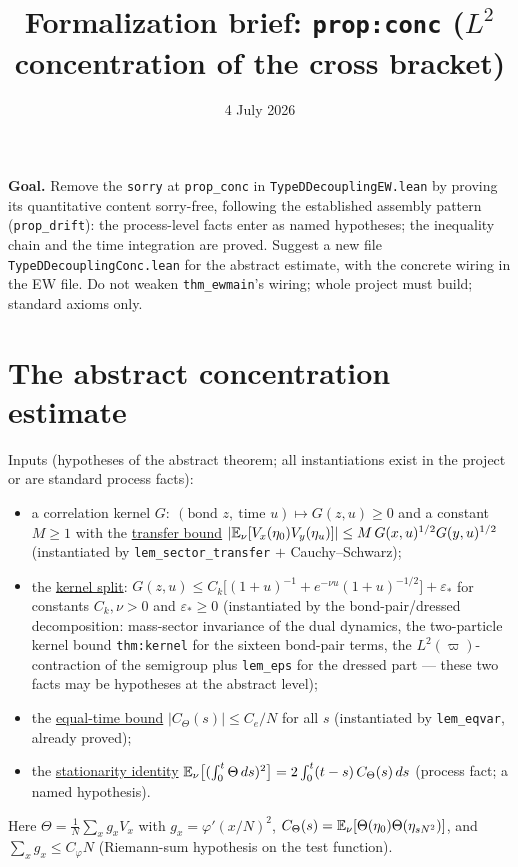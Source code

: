 \documentclass[11pt]{article}
\title{Formalization brief: \texttt{prop:conc} ($L^2$ concentration of the cross bracket)}
\date{4 July 2026}
\theoremstyle{plain}
\theoremstyle{remark}
\newcommand{\eps}{\varepsilon}\newcommand{\vp}{\varpi}
\begin{document}
\maketitle

\noindent\textbf{Goal.} Remove the \texttt{sorry} at \texttt{prop\_conc} in
\texttt{TypeDDecouplingEW.lean} by proving its quantitative content sorry-free,
following the established assembly pattern (\texttt{prop\_drift}): the process-level
facts enter as named hypotheses; the inequality chain and the time integration are
proved. Suggest a new file \texttt{TypeDDecouplingConc.lean} for the abstract
estimate, with the concrete wiring in the EW file. Do not weaken
\texttt{thm\_ewmain}'s wiring; whole project must build; standard axioms only.

\section*{The abstract concentration estimate}

Inputs (hypotheses of the abstract theorem; all instantiations exist in the
project or are standard process facts):
\begin{itemize}
\item a correlation kernel $G:\ (\text{bond }z,\ \text{time }u)\mapsto G(z,u)\ge0$
  and a constant $M\ge1$ with the \underline{transfer bound}
  $|\mathbb{E}_\nu[V_x(\eta_0)V_y(\eta_u)]|\le M\,G(x,u)^{1/2}G(y,u)^{1/2}$
  (instantiated by \texttt{lem\_sector\_transfer} $+$ Cauchy--Schwarz);
\item the \underline{kernel split}: $G(z,u)\le
  C_k\big[(1+u)^{-1}+e^{-\nu u}(1+u)^{-1/2}\big]+\eps_\ast$ for constants
  $C_k,\nu>0$ and $\eps_\ast\ge0$ (instantiated by the bond-pair/dressed
  decomposition: mass-sector invariance of the dual dynamics, the two-particle
  kernel bound \texttt{thm:kernel} for the sixteen bond-pair terms, the
  $L^2(\vp)$-contraction of the semigroup plus \texttt{lem\_eps} for the dressed
  part --- these two facts may be hypotheses at the abstract level);
\item the \underline{equal-time bound} $|C_\Theta(s)|\le C_e/N$ for all $s$
  (instantiated by \texttt{lem\_eqvar}, already proved);
\item the \underline{stationarity identity}
  $\mathbb{E}_\nu\big[(\int_0^t\Theta\,ds)^2\big]=2\int_0^t(t-s)\,C_\Theta(s)\,ds$
  (process fact; a named hypothesis).
\end{itemize}
Here $\Theta=\frac1N\sum_xg_x V_x$ with $g_x=\varphi'(x/N)^2$,
$C_\Theta(s)=\mathbb{E}_\nu[\Theta(\eta_0)\Theta(\eta_{sN^2})]$, and
$\sum_x g_x\le C_\varphi N$ (Riemann-sum hypothesis on the test function).
\end{document}
